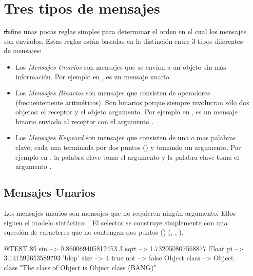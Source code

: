 \documentclass[a4paper,10pt,twoside]{book}
\begin{document}
\section{Tres tipos de mensajes}

\st define unas pocas reglas simples para determinar el orden en el cual los mensajes son enviados. Estas reglas est\'an basadas en la distinci\'on entre 3 tipos diferentes de mensajes:
\begin{itemize}
\item Los \emph{Mensajes Unarios} son mensajes que se env\'ian a un objeto sin m\'as informaci\'on. Por ejemplo en ,  es un mensaje unario.
\item Los \emph{Mensajes Binarios} son mensajes que consisten de operadores (frecuentemente aritm\'eticos). Son binarios porque siempre involucran s\'olo dos objetos: el receptor y el objeto argumento. Por ejemplo en , \ct{+} es un mensaje binario enviado al receptor  con el argumento .
\item Los \emph{Mensajes Keyword} son mensajes que consisten de una o mas palabras clave, cada una terminada por dos puntos (\ct{:}) y tomando un argumento. Por ejemplo en , la palabra clave  toma el argumento  y la palabra clave  toma el argumento .
\end{itemize}

\subsection{Mensajes Unarios}
Los mensajes unarios son mensajes que no requieren ning\'un argumento. Ellos siguen el modelo sint\'actico: . El selector se construye simplemente con una sucesi\'on de caracteres que no contengan dos puntos (\ct{:}) (\eg {}, , ).
\begin{code}{@TEST}
89 sin           --> 0.860069405812453
3 sqrt           --> 1.732050807568877
Float pi         --> 3.141592653589793
'blop' size     --> 4
true not        --> false
Object class --> Object class  "The class of Object is Object class (BANG)"
\end{code}

\end{document}
